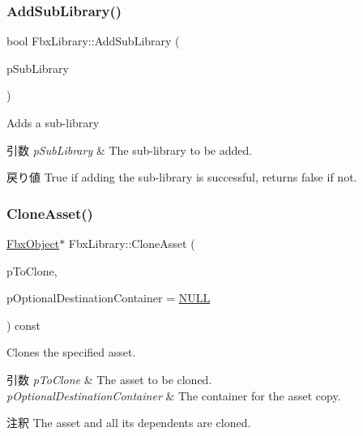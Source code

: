 \subsubsection{\texorpdfstring{Add\+Sub\+Library()}{AddSubLibrary()}}
{\footnotesize\ttfamily bool Fbx\+Library\+::\+Add\+Sub\+Library (\begin{DoxyParamCaption}\item[{\hyperlink{class_fbx_library}{Fbx\+Library} $\ast$}]{p\+Sub\+Library }\end{DoxyParamCaption})}

Adds a sub-\/library 
\begin{DoxyParams}{引数}
{\em p\+Sub\+Library} & The sub-\/library to be added. \\
\hline
\end{DoxyParams}
\begin{DoxyReturn}{戻り値}
{\ttfamily True} if adding the sub-\/library is successful, returns {\ttfamily false} if not. 
\end{DoxyReturn}
\mbox{\label{class_fbx_library_ad1c56ae40f4e371c7e0395ce3362dbcc}} 
\subsubsection{\texorpdfstring{Clone\+Asset()}{CloneAsset()}}
{\footnotesize\ttfamily \hyperlink{class_fbx_object}{Fbx\+Object}$\ast$ Fbx\+Library\+::\+Clone\+Asset (\begin{DoxyParamCaption}\item[{\hyperlink{class_fbx_object}{Fbx\+Object} $\ast$}]{p\+To\+Clone,  }\item[{\hyperlink{class_fbx_object}{Fbx\+Object} $\ast$}]{p\+Optional\+Destination\+Container = {\ttfamily \hyperlink{fbxarch_8h_a070d2ce7b6bb7e5c05602aa8c308d0c4}{N\+U\+LL}} }\end{DoxyParamCaption}) const}

Clones the specified asset. 
\begin{DoxyParams}{引数}
{\em p\+To\+Clone} & The asset to be cloned. \\
\hline
{\em p\+Optional\+Destination\+Container} & The container for the asset copy. \\
\hline
\end{DoxyParams}
\begin{DoxyRemark}{注釈}
The asset and all its dependents are cloned. 
\end{DoxyRemark}
\mbox{\label{class_fbx_library_a8e9fbf97f6753d859411f284db16f964}} 
